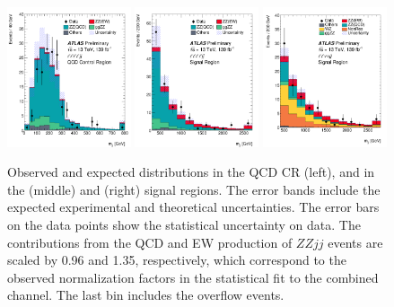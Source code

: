 \begin{figure}[!htbp]
\begin{center}
\includegraphics[width=0.325\textwidth]{figures/4l/MJJ_4l_QCD_CR.pdf}
\includegraphics[width=0.325\textwidth]{figures/4l/MJJ_4l_SR.pdf}
\includegraphics[width=0.325\textwidth]{figures/llvv/MJJ_2l2v_SR.pdf}\\
\end{center}
\caption{Observed and expected \mjj distributions in the \lllljj QCD CR (left), 
        and in the \lllljj (middle) and \llvvjj (right) signal regions.
        The error bands include the expected experimental and theoretical uncertainties.
        The error bars on the data points show the statistical uncertainty on data.
        The contributions from the QCD and EW production of $ZZjj$ events are scaled by 0.96 and 1.35, respectively, 
        which correspond to the observed normalization factors in the statistical fit to the combined channel.
        The last bin includes the overflow events.
        }
\label{fig:mjj}
\end{figure}

